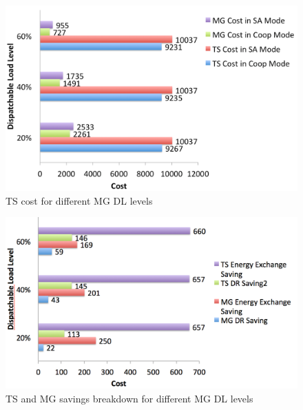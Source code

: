 \begin{figure}[H]
\centering
\includegraphics[scale=0.25]{pdsize1.png}
\caption{TS cost for different MG DL levels}
\label{pdsize}
\end{figure}

\begin{figure}[H]
\centering
\includegraphics[scale=0.6]{pdsize2.png}
\caption{TS and MG savings breakdown for different MG DL levels}
\label{pdsize2}
\end{figure}

